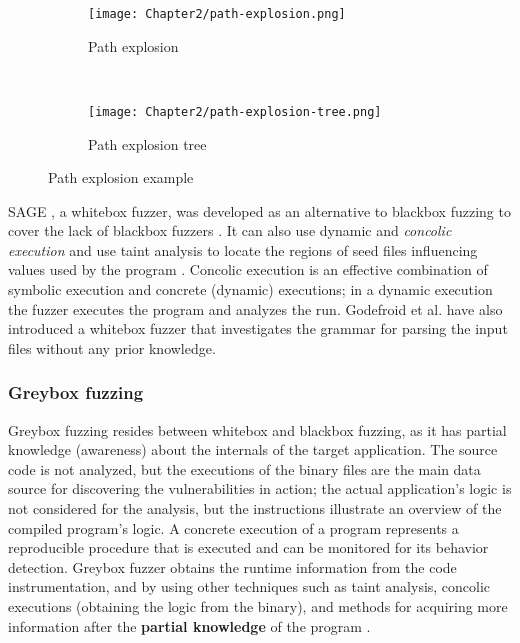 \begin{figure}[!b]
  \begin{adjustbox}{center,max width=1.3\textwidth}
      \begin{subfigure}[t]{0.30\textwidth}
          \centering
          \texttt{[image: Chapter2/path-explosion.png]}
          \vspace*{-5mm}
          \caption{Path explosion}
          \label{fig:pathx}
          \vspace*{5mm}
      \end{subfigure}
      ~
      \begin{subfigure}[b]{0.80\textwidth}
          \centering
          \texttt{[image: Chapter2/path-explosion-tree.png]}
          \vspace*{-5mm}
          \caption{Path explosion tree}
          \label{fig:pathx3}
          \vspace*{5mm}
      \end{subfigure}
  \end{adjustbox}
  \caption{Path explosion example}
  \label{fig:path}
\end{figure}

SAGE \cite{godefroid2012sage}, a whitebox fuzzer, was developed as an alternative to blackbox fuzzing to cover the lack of blackbox fuzzers \cite{cadar2011symbolic}. It can also use dynamic and \textit{concolic execution} \cite{stephens2016driller} and use taint analysis to locate the regions of seed files influencing values used by the program \cite{ganesh2009taint}. Concolic execution is an effective combination of symbolic execution and concrete (dynamic) executions; in a dynamic execution the fuzzer executes the program and analyzes the run. Godefroid et al. \cite{godefroid2008grammar} have also introduced a whitebox fuzzer that investigates the grammar for parsing the input files without any prior knowledge.

\subsubsection{Greybox fuzzing}

Greybox fuzzing resides between whitebox and blackbox fuzzing, as it has partial knowledge (awareness) about the internals of the target application. The source code is not analyzed, but the executions of the binary files are the main data source for discovering the vulnerabilities in action; the actual application's logic is not considered for the analysis, but the instructions illustrate an overview of the compiled program's logic. A concrete execution of a program represents a reproducible procedure that is executed and can be monitored for its behavior detection. Greybox fuzzer obtains the runtime information from the code instrumentation, and by using other techniques such as taint analysis, concolic executions (obtaining the logic from the binary), and methods for acquiring more information after the \textbf{partial knowledge} of the program \cite{liang2018fuzzing,choi2015dynamic}. 

